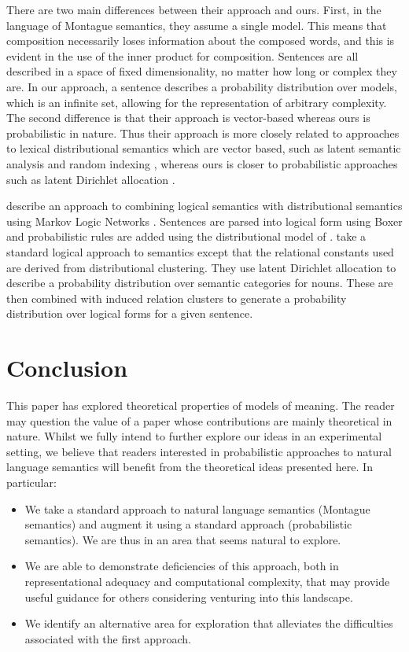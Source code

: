 \documentclass[manuscript]{clv2}
\newcommand{\newcite}[1]{\namecite{#1}}
\begin{document}
There are two main differences between their approach and ours. First,
in the language of Montague semantics, they assume a single
model. This means that composition necessarily loses information about
the composed words, and this is evident in the use of the inner
product for composition. Sentences are all described in a space of
fixed dimensionality, no matter how long or complex they are. In our
approach, a sentence describes a probability distribution over models,
which is an infinite set, allowing for the representation of arbitrary
complexity. The second difference is that their approach is vector-based whereas
ours is probabilistic in nature. Thus their approach is more
closely related to approaches to lexical distributional semantics
which are vector based, such as latent semantic analysis
\cite{Deerwester:90} and random indexing \cite{Sahlgren:02}, whereas
ours is closer to probabilistic approaches such as latent Dirichlet
allocation \cite{Blei:03}.

\newcite{Garrette:11} describe an approach to combining logical
semantics with distributional semantics using Markov Logic Networks
\cite{Richardson:06}. Sentences are parsed into logical form using
Boxer \cite{Bos:04} and probabilistic rules are added using the
distributional model of \newcite{Erk:10}. \newcite{Lewis:13} take a standard logical approach to
semantics except that the relational constants used are derived from
distributional clustering. 
They use latent Dirichlet allocation to
describe a probability distribution over semantic categories for
nouns. These are then combined with induced relation clusters to
generate a probability distribution over logical forms for a given
sentence.

\section{Conclusion}

This paper has explored theoretical properties of models of meaning. The
reader may question the value of a paper whose contributions
are mainly theoretical in nature. Whilst we fully intend to further explore
our ideas in an experimental setting, we believe that readers
interested in probabilistic approaches to natural language semantics
will benefit from the theoretical ideas presented here. In particular:

\begin{itemize}
\item We take a standard approach to natural language semantics
  (Montague semantics) and augment it using a standard approach
  (probabilistic semantics). We are thus in an area that seems natural
  to explore.
\item We are able to demonstrate deficiencies of this approach, both
  in representational adequacy and computational complexity, that may provide
  useful guidance for others considering venturing into this
  landscape.
\item We identify an alternative area for exploration that alleviates
  the difficulties associated with the first approach.
\end{itemize}
\end{document}
